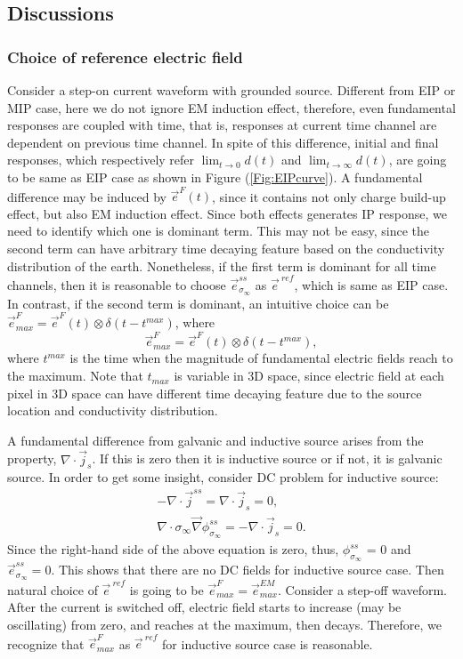 \documentclass[a4paper, 11pt]{article}
\renewcommand{\div}{\nabla\cdot}
\newcommand{\grad}{\vec \nabla}
\newcommand{\siginf}{\sigma_\infty}
\renewcommand {\j}  { {\vec j} }
\newcommand {\e}  { {\vec e} }
\begin{document}
\subsection{Discussions}

\subsubsection{Choice of reference electric field}
Consider a step-on current waveform with grounded source. Different from EIP or MIP case, here we do not ignore EM induction effect, therefore, even fundamental responses are coupled with time, that is, responses at current time channel are dependent on previous time channel. In spite of this difference, initial and final responses, which respectively refer $\lim_{t\rightarrow 0}d (t)$ and $\lim_{t\rightarrow \infty}d (t)$, are going to be same as EIP case as shown in Figure (\ref{Fig:EIPcurve}). A fundamental difference may be induced by $\e^F(t)$, since it contains not only charge build-up effect, but also EM induction effect. Since both effects generates IP response, we need to identify which one is dominant term. This may not be easy, since the second term can have arbitrary time decaying feature based on the conductivity distribution of the earth. Nonetheless, if the first term is dominant for all time channels, then it is reasonable to choose $\e^{ss}_{\siginf}$ as $\e^{\ ref}$, which is same as EIP case. In contrast, if the second term is dominant, an intuitive choice can be $\e^{F}_{max} = \e^{F}(t) \otimes \delta(t-t^{max})$, where
\begin{equation}
  \e^{F}_{max} = \e^{F}(t) \otimes \delta(t-t^{max}),
\end{equation}
where $t^{max}$ is the time when the magnitude of fundamental electric fields reach to the maximum. Note that $t_{max}$ is variable in 3D space, since electric field at each pixel in 3D space can have different time decaying feature due to the source location and conductivity distribution.

A fundamental difference from galvanic and inductive source arises from the property, $\div\j_s$.  If this is zero then it is inductive source or if not, it is galvanic source. In order to get some insight, consider DC problem for inductive source:
\begin{eqnarray*}
    -\div\j^{ss} = \div\j_s = 0, \\
    \div \siginf \grad \phi^{ss}_{\siginf} = -\div\j_s = 0.
\end{eqnarray*}
Since the right-hand side of the above equation is zero, thus, $\phi^{ss}_{\siginf}$ = 0 and $\e^{ss}_{\siginf}=0$. This shows that there are no DC fields for inductive source case. Then natural choice of $\e^{\ ref}$ is going to be $\e^{F}_{max} = \e^{EM}_{max}$. Consider a step-off waveform. After the current is switched off, electric field starts to increase (may be oscillating) from zero, and reaches at the maximum, then decays. Therefore, we recognize that $\e^{F}_{max}$ as $\e^{\ ref}$ for inductive source case is reasonable.
\end{document}
